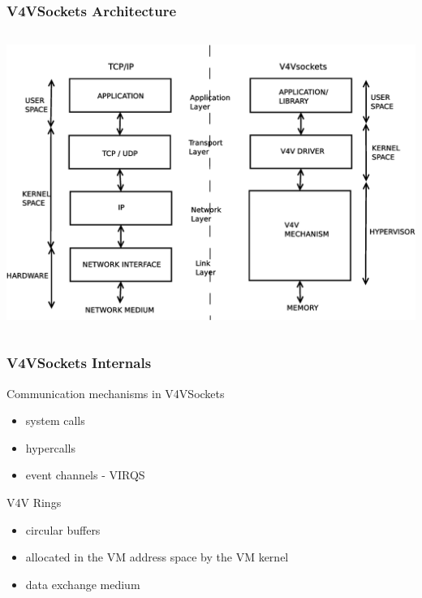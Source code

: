 \documentclass[red,slidestop,notes,compress,mathserif]{beamer}
\begin{document}
\begin{frame}
\frametitle{V4VSockets Architecture}
\begin{columns}
\includegraphics[width=\textwidth]{figures/tcp_ip_vs_v4vsockets.eps}
\end{columns}
\end{frame}

\begin{frame}
\frametitle{V4VSockets Internals}
\begin{block}{Communication mechanisms in V4VSockets}
\begin{itemize}
\item system calls 
\item hypercalls
\item event channels - VIRQS
\end{itemize}
\end{block}
\begin{block}{V4V Rings}
\begin{itemize}
\item circular buffers 
\item allocated in the VM address space by the VM kernel
\item data exchange medium
\end{itemize}
\end{block}
\end{frame}
\end{document}
